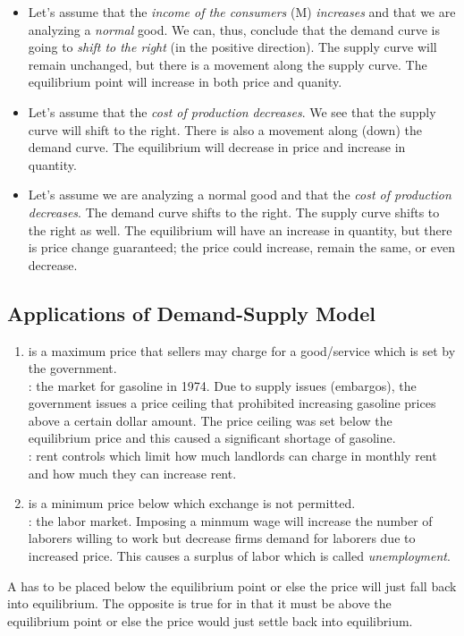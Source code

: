 \documentclass{article}
\begin{document}
\begin{itemize}
  \item Let's assume that the \emph{income of the consumers} (M) \emph{increases} and that we are analyzing a \emph{normal} good. We can, thus, conclude that the demand curve is going to \emph{shift to the right} (in the positive direction). The supply curve will remain unchanged, but there is a movement along the supply curve. The equilibrium point will increase in both price and quanity. 
  \item Let's assume that the \emph{cost of production} \emph{decreases}. We see that the supply curve will shift to the right. There is also a movement along (down) the demand curve. The equilibrium will decrease in price and increase in quantity. 
  \item Let's assume we are analyzing a normal good and that the \emph{cost of production decreases}. The demand curve shifts to the right. The supply curve shifts to the right as well. The equilibrium will have an increase in quantity, but there is price change guaranteed; the price could increase, remain the same, or even decrease. 
\end{itemize}

\subsection{Applications of Demand-Supply Model}

\begin{enumerate}
  \item {} is a maximum price that sellers may charge for a good/service which is set by the government. \\ 

    : the market for gasoline in 1974. Due to supply issues (embargos), the government issues a price ceiling that prohibited increasing gasoline prices above a certain dollar amount. The price ceiling was set below the equilibrium price and this caused a significant shortage of gasoline. \\ 

    : rent controls which limit how much landlords can charge in monthly rent and how much they can increase rent. 

  \item {} is a minimum price below which exchange is not permitted. \\

    : the labor market. Imposing a minmum wage will increase the number of laborers willing to work but decrease firms demand for laborers due to increased price. This causes a surplus of labor which is called \emph{unemployment}. 
\end{enumerate}

A  has to be placed below the equilibrium point or else the price will just fall back into equilibrium. The opposite is true for  in that it must be above the equilibrium point or else the price would just settle back into equilibrium. 
\end{document}
